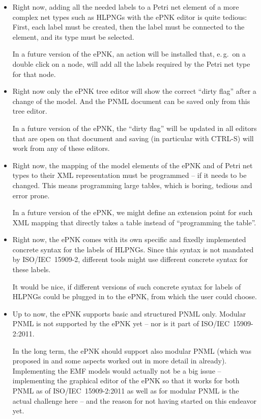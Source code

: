\begin{itemize}
  \item Right now, adding all the needed labels to a Petri net element of
        a more complex net types such as HLPNGs with the ePNK editor is quite
        tedious: First, each label must be created, then the label must
        be connected to the element, and its type must be selected.
        
        In a future version of the ePNK, an action will be installed that,
        e.\,g.\ on a double click on a node, will add all the labels required by
        the Petri net type for that node. 

  \item Right now only the ePNK tree editor will show the correct ``dirty flag''
        after a change of the model. And the PNML document can be saved
        only from this tree editor.
  
        In a future version of the ePNK, the ``dirty flag'' will be updated in
        all editors that are open on that document and saving (in particular with CTRL-S)
        will work from any of these editors.

  \item Right now, the mapping of the model elements of the ePNK and of
        Petri net types to their XML representation must be programmed --
        if it needs to be changed. This means programming large tables,
        which is boring, tedious and error prone.
        
        In a future version of the ePNK, we might define an extension point for
        such XML mapping that directly takes a table instead of
        ``programming the table''.
        
  \item Right now, the ePNK comes with its own specific and fixedly
        implemented concrete syntax for the labels of HLPNGs. Since this
        syntax is not mandated by ISO/IEC~15909-2, different tools might
        use different concrete syntax for these labels. 
        
        It would be nice, if different versions of such concrete syntax for
        labels of HLPNGs could be plugged in to the ePNK, from which the user
        could choose.
          
  \item Up to now, the ePNK supports basic and structured PNML
        \cite{WeKi03} only. Modular PNML is not supported by the ePNK yet 
        -- nor is it part of ISO/IEC~15909-2:2011.
        
        In the long term, the ePNK should support also modular PNML
        (which was proposed in \cite{WeKi03} and some aspects worked
         out in more detail in \cite{Kin07} already). Implementing the
        EMF models would actually not be a big issue -- implementing
        the graphical editor of the ePNK so that it works for both
        PNML as of ISO/IEC~15909-2:2011 as well as for modular PNML
        is the actual challenge here -- and the reason for not
        having started on this endeavor yet.
\end{itemize}
  